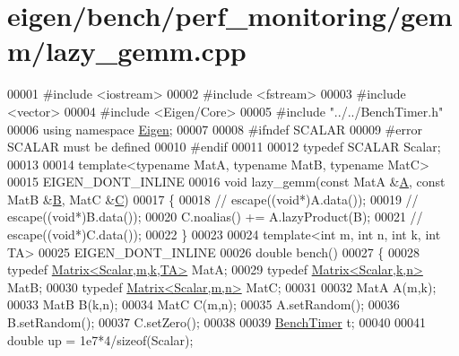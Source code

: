 \hypertarget{eigen_2bench_2perf__monitoring_2gemm_2lazy__gemm_8cpp_source}{}\section{eigen/bench/perf\+\_\+monitoring/gemm/lazy\+\_\+gemm.cpp}
\label{eigen_2bench_2perf__monitoring_2gemm_2lazy__gemm_8cpp_source}

\begin{DoxyCode}
00001 \textcolor{preprocessor}{#include <iostream>}
00002 \textcolor{preprocessor}{#include <fstream>}
00003 \textcolor{preprocessor}{#include <vector>}
00004 \textcolor{preprocessor}{#include <Eigen/Core>}
00005 \textcolor{preprocessor}{#include "../../BenchTimer.h"}
00006 \textcolor{keyword}{using namespace }\hyperlink{namespace_eigen}{Eigen};
00007 
00008 \textcolor{preprocessor}{#ifndef SCALAR}
00009 \textcolor{preprocessor}{#error SCALAR must be defined}
00010 \textcolor{preprocessor}{#endif}
00011 
00012 \textcolor{keyword}{typedef} SCALAR Scalar;
00013 
00014 \textcolor{keyword}{template}<\textcolor{keyword}{typename} MatA, \textcolor{keyword}{typename} MatB, \textcolor{keyword}{typename} MatC>
00015 EIGEN\_DONT\_INLINE
00016 \textcolor{keywordtype}{void} lazy\_gemm(\textcolor{keyword}{const} MatA &\hyperlink{group___core___module_class_eigen_1_1_matrix}{A}, \textcolor{keyword}{const} MatB &\hyperlink{group___core___module_class_eigen_1_1_matrix}{B}, MatC &\hyperlink{group___core___module}{C})
00017 \{
00018 \textcolor{comment}{//   escape((void*)A.data());}
00019 \textcolor{comment}{//   escape((void*)B.data());}
00020   C.noalias() += A.lazyProduct(B);
00021 \textcolor{comment}{//   escape((void*)C.data());}
00022 \}
00023 
00024 \textcolor{keyword}{template}<\textcolor{keywordtype}{int} m, \textcolor{keywordtype}{int} n, \textcolor{keywordtype}{int} k, \textcolor{keywordtype}{int} TA>
00025 EIGEN\_DONT\_INLINE
00026 \textcolor{keywordtype}{double} bench()
00027 \{
00028   \textcolor{keyword}{typedef} \hyperlink{group___core___module_class_eigen_1_1_matrix}{Matrix<Scalar,m,k,TA>} MatA;
00029   \textcolor{keyword}{typedef} \hyperlink{group___core___module_class_eigen_1_1_matrix}{Matrix<Scalar,k,n>} MatB;
00030   \textcolor{keyword}{typedef} \hyperlink{group___core___module_class_eigen_1_1_matrix}{Matrix<Scalar,m,n>} MatC;
00031 
00032   MatA A(m,k);
00033   MatB B(k,n);
00034   MatC C(m,n);
00035   A.setRandom();
00036   B.setRandom();
00037   C.setZero();
00038 
00039   \hyperlink{class_eigen_1_1_bench_timer}{BenchTimer} t;
00040 
00041   \textcolor{keywordtype}{double} up = 1e7*4/\textcolor{keyword}{sizeof}(Scalar);

\end{DoxyCode}
